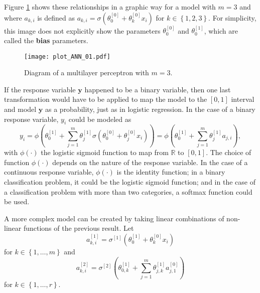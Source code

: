 Figure \ref{fig:theory_ANN_diagram_01} shows these relationships in a graphic way for a model with $m = 3$ and where $a_{k, i}$ is defined as $a_{k, i} = \sigma \left( \theta_0^{[0]} + \theta_k^{[0]} x_i \right)$ for $k \in \left\{ 1, 2, 3 \right\}$.
For simplicity, this image does not explicitly show the parameters $\theta_0^{[0]}$ and $\theta_0^{[1]}$, which are called the \textbf{bias} parameters.

\begin{figure}[H]
    \centering
    \texttt{[image: plot\_ANN\_01.pdf]}
    \caption{Diagram of a multilayer perceptron with $m = 3$.}
    \label{fig:theory_ANN_diagram_01}
\end{figure}

If the response variable $\boldsymbol{y}$ happened to be a binary variable, then one last transformation would have to be applied to map the model to the $\left[0, 1\right]$ interval and model $\boldsymbol{y}$ as a probability, just as in logistic regression. In the case of a binary response variable, $y_i$ could be modeled as
\begin{equation}
  y_i =
  \phi \left( \theta_0^{[1]} +  \sum_{j = 1}^m \theta_j^{[1]} \sigma \left( \theta_0^{[0]} + \theta_j^{[0]} x_i \right) \right) =
  \phi \left( \theta_0^{[1]} +  \sum_{j = 1}^m \theta_j^{[1]} a_{j,i} \right),
\end{equation}
with $\phi(\cdot)$ the logistic sigmoid function to map from $\mathbb{R}$ to $\left[ 0, 1 \right]$. The choice of function $\phi(\cdot)$ depends on the nature of the response variable. In the case of a continuous response variable, $\phi(\cdot)$ is the identity function; in a binary classification problem, it could be the logistic sigmoid function; and in the case of a classification problem with more than two categories, a softmax function could be used.

A more complex model can be created by taking linear combinations of non-linear functions of the previous result. Let
\begin{equation}
a_{k,i}^{[1]} = \sigma^{[1]} \left( \theta_{0}^{[1]} + \theta_k^{[0]} x_i \right)
\end{equation}
for $k \in \left\{ 1, \ldots, m \right\}$ and
\begin{equation}
  a_{k,i}^{[2]} = \sigma^{[2]} \left(  \theta_{0,k}^{[1]} + \sum_{j = 1}^m \theta_{j,k}^{[1]} a_{j,1}^{[0]}  \right)
\end{equation}for $k \in \left\{ 1, \ldots, r \right\}$.

